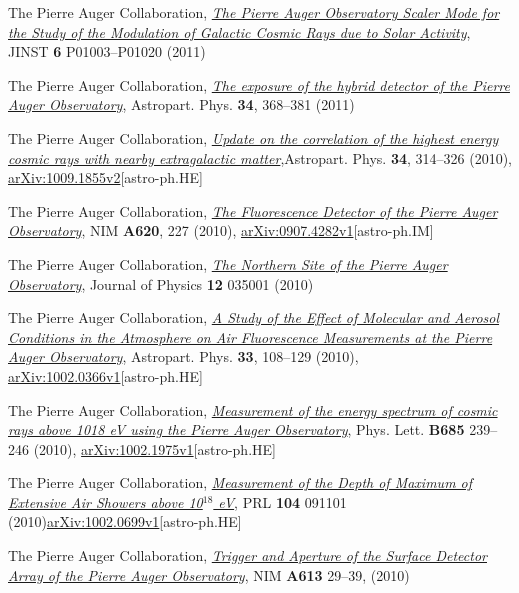 \documentclass[11pt, a4paper]{article}
\newcommand{\years}[1]{\marginnote{\scriptsize #1}}
\begin{document}
\years{2011}The Pierre Auger Collaboration, 
\href{http://dx.doi.org/10.1088/1748-0221/6/01/P01003}{\emph{The Pierre Auger Observatory Scaler Mode for the Study of the Modulation of Galactic Cosmic Rays due to Solar Activity}}, JINST {\bf 6} P01003--P01020 (2011)

\years{2010}The Pierre Auger Collaboration, 
\href{http://dx.doi.org/10.1016/j.astropartphys.2010.10.001}{\emph{The exposure of the hybrid detector of the Pierre Auger Observatory}}, Astropart. Phys. {\bf 34}, 368--381 (2011)

\years{2010}The Pierre Auger Collaboration, \href{http://dx.doi.org/10.1016/j.astropartphys.2010.08.010}{\emph{Update on the correlation of the highest energy cosmic rays with nearby extragalactic matter}},Astropart. Phys. {\bf 34}, 314--326 (2010), \href{http://arxiv.org/abs/1009.1855}{arXiv:1009.1855v2}[astro-ph.HE]

\years{2010}The Pierre Auger Collaboration, \href{http://dx.doi.org/10.1016/j.nima.2010.04.023}{\emph{The Fluorescence Detector of the Pierre Auger Observatory}}, NIM {\bf A620}, 227 (2010), \href{http://arxiv.org/abs/0907.4282}{arXiv:0907.4282v1}[astro-ph.IM]

\years{2010}The Pierre Auger Collaboration, \href{http://dx.doi.org/10.1088/1367-2630/12/3/035001}{\emph{The Northern Site of the Pierre Auger Observatory}}, Journal of Physics {\bf 12} 035001 (2010)

\years{2010}The Pierre Auger Collaboration, \href{http://dx.doi.org/10.1016/j.astropartphys.2009.12.005}{\emph{A Study of the Effect of Molecular and Aerosol Conditions in the Atmosphere on Air Fluorescence Measurements at the Pierre Auger Observatory}}, Astropart. Phys. {\bf 33}, 108--129 (2010), \href{http://arxiv.org/abs/0907.4282}{arXiv:1002.0366v1}[astro-ph.HE]

\years{2010}The Pierre Auger Collaboration, \href{http://dx.doi.org/10.1016/j.physletb.2010.02.013}{\emph{Measurement of the energy spectrum of cosmic rays above 1018 eV using the Pierre Auger Observatory}}, Phys. Lett. {\bf B685} 239--246 (2010), \href{http://arxiv.org/abs/1002.1975}{arXiv:1002.1975v1}[astro-ph.HE]

\years{2010}The Pierre Auger Collaboration, \href{http://dx.doi.org/10.1103/PhysRevLett.104.091101}{\emph{Measurement of the Depth of Maximum of Extensive Air Showers above 10$^{18}$ eV}}, PRL {\bf 104} 091101 (2010)\href{http://arxiv.org/abs/1002.0699}{arXiv:1002.0699v1}[astro-ph.HE]

\years{2010}The Pierre Auger Collaboration, \href{http://dx.doi.org/10.1016/j.nima.2009.11.018}{\emph{Trigger and Aperture of the Surface Detector Array of the Pierre Auger Observatory}}, NIM {\bf A613} 29--39, (2010)
\end{document}
